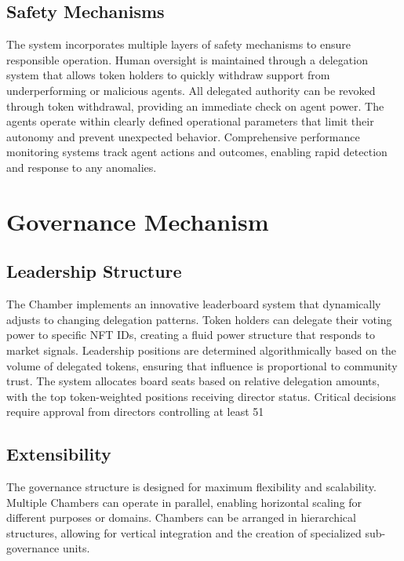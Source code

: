 \documentclass[12pt]{article}
\begin{document}
\subsection{Safety Mechanisms}
The system incorporates multiple layers of safety mechanisms to ensure responsible operation. Human oversight is maintained through a delegation system that allows token holders to quickly withdraw support from underperforming or malicious agents. All delegated authority can be revoked through token withdrawal, providing an immediate check on agent power. The agents operate within clearly defined operational parameters that limit their autonomy and prevent unexpected behavior. Comprehensive performance monitoring systems track agent actions and outcomes, enabling rapid detection and response to any anomalies.

\section{Governance Mechanism}

\subsection{Leadership Structure}
The Chamber implements an innovative leaderboard system that dynamically adjusts to changing delegation patterns. Token holders can delegate their voting power to specific NFT IDs, creating a fluid power structure that responds to market signals. Leadership positions are determined algorithmically based on the volume of delegated tokens, ensuring that influence is proportional to community trust. The system allocates board seats based on relative delegation amounts, with the top token-weighted positions receiving director status. Critical decisions require approval from directors controlling at least 51%

\subsection{Extensibility}
The governance structure is designed for maximum flexibility and scalability. Multiple Chambers can operate in parallel, enabling horizontal scaling for different purposes or domains. Chambers can be arranged in hierarchical structures, allowing for vertical integration and the creation of specialized sub-governance units.
\end{document}
